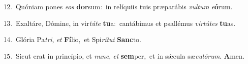{\numbfont\textcolor{\numbcolor}{12.}}~Quóniam pones \textit{e}\-\textit{os} \textbf{dor}\-sum:~\star in relíquiis tuis præparábis \textit{vul}\-\textit{tum} \textit{e}\-\textbf{ó}rum.\par
{\numbfont\textcolor{\numbcolor}{13.}}~Exaltáre, Dómine, in vir\-\textit{tú}\-\textit{te} \textbf{tu}\-a:~\star cantábimus et psallémus \textit{vir}\-\textit{tú}\textit{tes} \textbf{tu}\-as.\par
{\numbfont\textcolor{\numbcolor}{14.}}~Glória Pa\-\textit{tri}\-, \textit{et} \textbf{Fí}\-lio,~\star et Spi\-\textit{rí}\-\textit{tu}\textit{i} \textbf{Sanc}\-to.\par
{\numbfont\textcolor{\numbcolor}{15.}}~Sicut erat in princípio, et \textit{nunc}\-, \textit{et} \textbf{sem}\-per,~\star et in sǽcula sæ\-\textit{cu}\-\textit{ló}\textit{rum}. \textbf{A}\-men.\par
